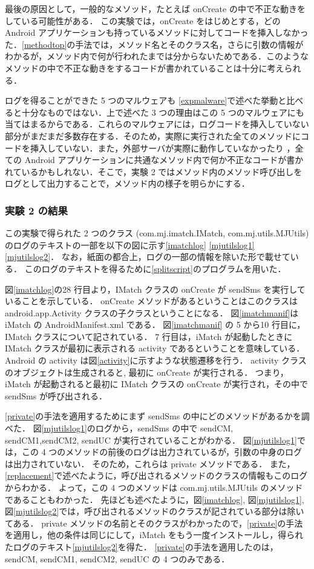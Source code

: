 最後の原因として，一般的なメソッド，たとえば onCreate の中で不正な動きをしている可能性がある． この実験では，onCreate をはじめとする，どの Android アプリケーションも持っているメソッドに対してコードを挿入しなかった．\ref{methodtop}の手法では，メソッド名とそのクラス名，さらに引数の情報がわかるが，メソッド内で何が行われたまでは分からないためである．このようなメソッドの中で不正な動きをするコードが書かれていることは十分に考えられる．


ログを得ることができた 5 つのマルウェアも \ref{expmalware}で述べた挙動と比べると十分なものではない．上で述べた 3 つの理由はこの 5 つのマルウェアにも当てはまるからである．これらのマルウェアには，ログコードを挿入していない部分がまだまだ多数存在する．そのため，実際に実行された全てのメソッドにコードを挿入していない．また，外部サーバが実際に動作していなかったり ，全ての Android アプリケーションに共通なメソッド内で何か不正なコードが書かれているかもしれない．そこで，実験 2 ではメソッド内のメソッド呼び出しをログとして出力することで，メソッド内の様子を明らかにする．


\subsubsection{実験 2 の結果}
この実験で得られた 2 つのクラス (com.mj.imatch.IMatch, com.mj.utils.MJUtils) のログのテキストの一部を以下の図に示す\ref{imatchlog} \ref{mjutilslog1} \ref{mjutilslog2}．
なお，紙面の都合上，ログの一部の情報を除いた形で載せている．
このログのテキストを得るために\ref{splitscript}のプログラムを用いた．

図\ref{imatchlog}の28 行目より，IMatch クラスの onCreate が sendSms を実行していることを示している．
onCreate メソッドがあるということはこのクラスは android.app.Activity クラスの子クラスということになる．
図\ref{imatchmanif}は iMatch の AndroidManifest.xml である．
図\ref{imatchmanif} の 5 から10 行目に，IMatch クラスについて記されている．
7 行目は，iMatch が起動したときに IMatch クラスが最初に表示される activity であるということを意味している．
Android の activity は図\ref{activity}に示すような状態遷移を行う\cite{activity}．
activity クラスのオブジェクトは生成されると, 最初に onCreate が実行される．
つまり，iMatch が起動されると最初に IMatch クラスの onCreate が実行され，その中で sendSms が呼び出される．

\ref{private}の手法を適用するためにまず sendSms の中にどのメソッドがあるかを調べた．
図\ref{mjutilslog1}のログから，sendSms の中で sendCM, sendCM1,sendCM2, sendUC が実行されていることがわかる．
図\ref{mjutilslog1}では，この 4 つのメソッドの前後のログは出力されているが，引数の中身のログは出力されていない．
そのため，これらは private メソッドである．
また，\ref{replacement}で述べたように，呼び出されるメソッドのクラスの情報もこのログからわかる．
よって，この 4 つのメソッドは com.mj.utils.MJUtils のメソッドであることもわかった．
先ほども述べたように，図\ref{imatchlog}, 図\ref{mjutilslog1},  図\ref{mjutilslog2}では，呼び出されるメソッドのクラスが記されている部分は除いてある．
private メソッドの名前とそのクラスがわかったので，\ref{private}の手法を適用し，他の条件は同じにして，iMatch をもう一度インストールし，得られたログのテキスト\ref{mjutilslog2}を得た．
\ref{private}の手法を適用したのは，sendCM, sendCM1, sendCM2, sendUC の 4 つのみである．


